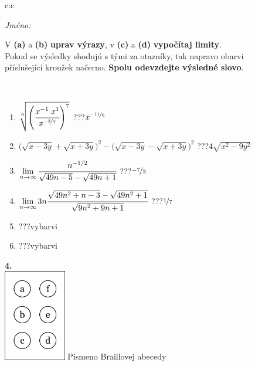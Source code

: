 \documentclass[10pt]{report}
\begin{document}
\begin{tabular}{c:c}
\begin{minipage}[c][104.5mm][t]{0.5\linewidth}
\begin{center}
\textit{Jméno:}\phantom{xxxxxxxxxxxxxxxxxxxxxxxxxxxxxxxxxxxxxxxxxxxxxxxxxxxxxxxxxxxxxxxxx}\\[5mm]
\begin{minipage}{0.95\linewidth}
\begin{center}
V \textbf{(a)} a \textbf{(b)} \textbf{uprav výrazy}, v \textbf{(c)} a \textbf{(d)} \textbf{vypočítaj limity}.\\Pokud se výsledky shodujú s tými za otazníky, tak napravo obarvi\\příslušející kroužek načerno. \textbf{Spolu odevzdejte výsledné slovo}.
\end{center}
\end{minipage}
\\[1mm]
\begin{minipage}{0.79\linewidth}
\begin{center}
\begin{varwidth}{\linewidth}
\begin{enumerate}
\small
\item $\sqrt[6]{\left(\cfrac{x^{-1}\;x^{1}}{x^{\nicefrac{-3}{7}}}\right)^{7}}$\quad \dotfill\; ???\;\dotfill \quad $x^{\nicefrac{-11}{6}}$
\item {\footnotesize{\scriptsize$\big(\sqrt{x-3y}+\sqrt{x+3y}\big)^2-\big(\sqrt{x-3y}-\sqrt{x+3y}\big)^2$}\quad \dotfill\; ???\;\dotfill \quad $4\sqrt{x^2-9y^2}$}
\item $\lim\limits_{n\to\infty}\cfrac{n^{-1/2}}{\sqrt{49n-5}-\sqrt{49n+1}}$\quad \dotfill\; ???\;\dotfill \quad $\nicefrac{-7}{3}$
\item $\lim\limits_{n\to\infty}3n\cfrac{\sqrt{49n^2+n-3}-\sqrt{49n^2+1}}{\sqrt{9n^2+9n+1}}$\quad \dotfill\; ???\;\dotfill \quad $\nicefrac{1}{7}$
\item \quad \dotfill\; ???\;\dotfill \quad vybarvi
\item \quad \dotfill\; ???\;\dotfill \quad vybarvi
\end{enumerate}
\end{varwidth}
\end{center}
\end{minipage}
\begin{minipage}{0.20\linewidth}
\begin{center}
{\Huge\bfseries 4.} \\[2mm]
\includegraphics[height=40mm]{../images/braille.png}
{\small Písmeno Braillovej abecedy}
\end{center}
\end{minipage}
\end{center}
\end{minipage}
%
\end{tabular}
\end{document}
